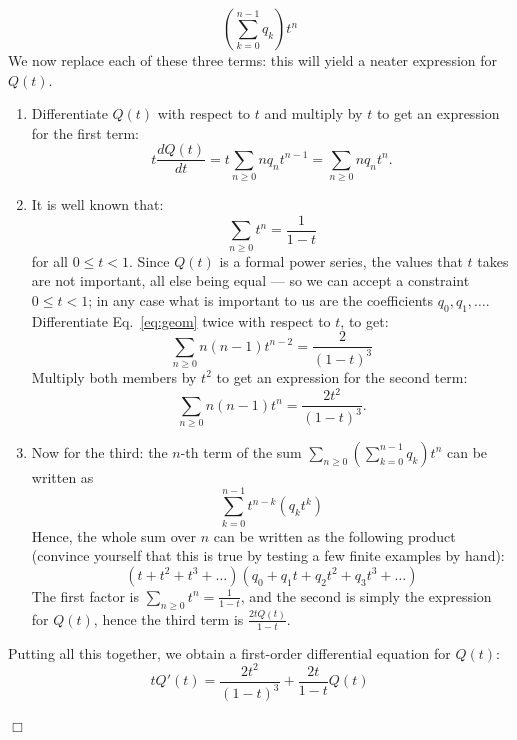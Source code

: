 \documentclass[a4paper]{book}
\theoremstyle{changebreak}                %
\newenvironment{proof}
 {{\sl Proof.}\hspace*{1 ex}}%
 {{\nopagebreak\hspace*{\fill}$\Box$\par\vspace{12pt}}}
\begin{document}
\begin{proof}
\begin{equation*}
  \left(\sum_{k=0}^{n-1} q_k\right) t^n
\end{equation*}
We now replace each of these three terms: this will yield a neater
expression for $Q(t)$. 
\begin{enumerate}
\item Differentiate $Q(t)$ with respect to $t$ and multiply by $t$ to
  get an expression for the first term:
\begin{equation*}
t\frac{d Q(t)}{dt} = t\sum_{n\ge 0}nq_n t^{n-1} = \sum_{n\ge 0} nq_nt^n.
\end{equation*}
\item It is well known that:
\begin{equation}
  \sum_{n\ge 0} t^n=\frac{1}{1-t} \label{eq:geom}
\end{equation}
for all $0\le t<1$. Since $Q(t)$ is a formal power series, the values
that $t$ takes are not important, all else being equal --- so we can
accept a constraint $0\le t<1$; in any case what is important to us
are the coefficients $q_0,q_1,\ldots$. Differentiate
Eq.~\eqref{eq:geom} twice with respect to $t$, to get:
\begin{equation*}
  \sum_{n\ge 0} n(n-1)t^{n-2} = \frac{2}{(1-t)^3}
\end{equation*}
Multiply both members by $t^2$ to get an expression for the
  second term:
\begin{equation}
  \sum_{n\ge 0} n(n-1)t^n = \frac{2t^2}{(1-t)^3}.
\end{equation}
\item Now for the third: the $n$-th term of the sum $\sum_{n\ge 0}
  (\sum_{k=0}^{n-1} q_k) t^n$ can be written as 
\begin{equation*}
  \sum_{k=0}^{n-1} t^{n-k}(q_kt^k)
\end{equation*}
Hence, the whole sum over $n$ can be written as the following
  product (convince yourself that this is true by
  testing a few finite examples by hand):
\begin{equation*}
  (t+t^2+t^3+\ldots) (q_0+q_1t+q_2t^2+q_3t^3+\ldots)
\end{equation*}
The first factor is $\sum_{n\ge 0}t^n = \frac{1}{1-t}$,
and the second is simply the expression for $Q(t)$, hence the third
term is $\frac{2tQ(t)}{1-t}$.
\end{enumerate}
Putting all this together, we obtain a first-order differential
equation for $Q(t)$:
\begin{equation}
  tQ'(t) = \frac{2t^2}{(1-t)^3} + \frac{2t}{1-t} Q(t) \label{eq1}

\end{equation}
\end{proof}
\end{document}
